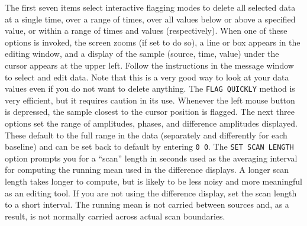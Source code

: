      The first seven items select interactive flagging modes to delete
all selected data at a single time, over a range of times, over all
values below or above a specified value, or within a range of times
and values (respectively).  When one of these options is invoked, the
screen zooms (if set to do so), a line or box appears in the editing
window, and a display of the sample (source, time, value) under the
cursor appears at the upper left.  Follow the instructions in the
message window to select and edit data.  Note that this is a very good
way to look at your data values even if you do not want to delete
anything.  The {\tt FLAG QUICKLY} method is very efficient, but it
requires caution in its use.  Whenever the left mouse button is
depressed, the sample closest to the cursor position is flagged.
The next three options set the range of amplitudes, phases, and
difference amplitudes displayed.  These default to the full range in
the data (separately and differently for each baseline) and can be set
back to default by entering {\tt 0 0}.  The {\tt SET SCAN LENGTH}
option prompts you for a ``scan'' length in seconds used as the
averaging interval for computing the running mean used in the
difference displays.  A longer scan length takes longer to compute,
but is likely to be less noisy and more meaningful as an editing tool.
If you are not using the difference display, set the scan length to a
short interval.  The running mean is not carried between sources and,
as a result, is not normally carried across actual scan boundaries.

